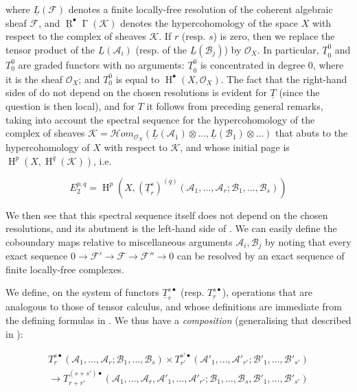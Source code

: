 where $\underline{L}(\mathcal{F})$ denotes a finite locally-free resolution of the coherent algebraic sheaf $\mathcal{F}$, and $\underline{\operatorname{R}}^\bullet\operatorname{\Gamma}(\mathcal{K})$ denotes the hypercohomology of the space $X$ with respect to the complex of sheaves $\mathcal{K}$.
If $r$ (resp. $s$) is zero, then we replace the tensor product of the $\underline{L}(\mathcal{A}_i)$ (resp. of the $\underline{L}(\mathcal{B}_j)$) by $\mathcal{O}_X$.
In particular, $\underline{T}_0^0$ and $T_0^0$ are graded functors with no arguments:
$\underline{T}_0^0$ is concentrated in degree $0$, where it is the sheaf $\mathcal{O}_X$;
and $T_0^0$ is equal to $\operatorname{H}^\bullet(X,\mathcal{O}_X)$.
The fact that the right-hand sides of  do not depend on the chosen resolutions is evident for $\underline{T}$ (since the question is then local), and for $T$ it follows from preceding general remarks, taking into account the spectral sequence for the hypercohomology of the complex of sheaves $\mathcal{K}=\mathcal{H}om_{\mathcal{O}_X}(\underline{L}(\mathcal{A}_1)\otimes\ldots,\underline{L}(\mathcal{B}_1)\otimes\ldots)$ that abuts to the hypercohomology of $X$ with respect to $\mathcal{K}$, and whose initial page is $\operatorname{H}^p(X,\operatorname{H}^q(\mathcal{K}))$, i.e.

\begin{equation}\tag{8.2}\label{fga1-equation-8.2}
  E_2^{p,q} = \operatorname{H}^p(X,(\underline{T}_r^s)^{(q)}(\mathcal{A}_1,\ldots,\mathcal{A}_r;\mathcal{B}_1,\ldots,\mathcal{B}_s))
\end{equation}

We then see that this spectral sequence itself does not depend on the chosen resolutions, and its abutment is the left-hand side of .
We can easily define the coboundary maps relative to miscellaneous arguments $\mathcal{A}_i,\mathcal{B}_j$ by noting that every exact sequence $0\to\mathcal{F}'\to\mathcal{F}\to\mathcal{F}''\to0$ can be resolved by an exact sequence of finite locally-free complexes.

We define, on the system of functors $\underline{T}_r^{s\bullet}$ (resp. $T_r^{s\bullet}$), operations that are analogous to those of tensor calculus, and whose definitions are immediate from the defining formulas in .
We thus have a \emph{composition} (generalising that described in ):

\begin{equation}\tag{8.3}\label{fga1-equation-8.3}
  \begin{aligned}
    T_r^{s\bullet}(\mathcal{A}_1,\ldots,\mathcal{A}_r;\mathcal{B}_1,\ldots,\mathcal{B}_s)
    \times T_{r'}^{s'\bullet}(\mathcal{A}'_1,\ldots,\mathcal{A}'_{r'};\mathcal{B}'_1,\ldots,\mathcal{B}'_{s'})
    \\\to T_{r+r'}^{(s+s')\bullet}(\mathcal{A}_1,\ldots,\mathcal{A}_r,\mathcal{A}'_1,\ldots,\mathcal{A}'_{r'};\mathcal{B}_1,\ldots,\mathcal{B}_s,\mathcal{B}'_1,\ldots,\mathcal{B}'_{s'})
  \end{aligned}
\end{equation}

